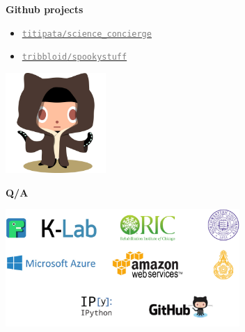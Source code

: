 \begin{frame}{\textbf{Github projects}}

\begin{itemize}
\item \href{https://github.com/titipata/science\_concierge}{\textcolor{gray}{\texttt{titipata/science\_concierge}}}
\item \href{https://github.com/tribbloid/spookystuff}{\textcolor{gray}{\texttt{tribbloid/spookystuff}}}
\end{itemize}

\begin{center}
\includegraphics[width=1.5in]{images/octobiwan}
\end{center}

\end{frame}


\begin{frame}

\begin{center}
\textbf{Q/A}
\end{center}

\begin{center}
\includegraphics[width=3.5in]{images/cover_back}
\end{center}

\end{frame}
